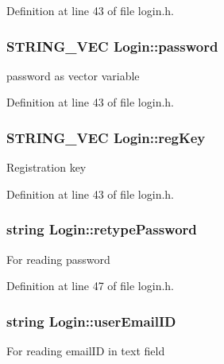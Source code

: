 Definition at line 43 of file login.\-h.

\hypertarget{classLogin_a39f7fd03b2b27c927c657ee73e7fcbbc}{
\subsubsection[{password}]{\setlength{\rightskip}{0pt plus 5cm}S\-T\-R\-I\-N\-G\-\_\-\-V\-E\-C Login\-::password\hspace{0.3cm}{\ttfamily [protected]}}}\label{classLogin_a39f7fd03b2b27c927c657ee73e7fcbbc}
password as vector variable 

Definition at line 43 of file login.\-h.

\hypertarget{classLogin_ae22f0ed73e5248cd71a7b2167676376a}{
\subsubsection[{reg\-Key}]{\setlength{\rightskip}{0pt plus 5cm}S\-T\-R\-I\-N\-G\-\_\-\-V\-E\-C Login\-::reg\-Key\hspace{0.3cm}{\ttfamily [protected]}}}\label{classLogin_ae22f0ed73e5248cd71a7b2167676376a}
Registration key 

Definition at line 43 of file login.\-h.

\hypertarget{classLogin_ade36f8943aafce470ef4b8353c79b2c6}{
\subsubsection[{retype\-Password}]{\setlength{\rightskip}{0pt plus 5cm}string Login\-::retype\-Password\hspace{0.3cm}{\ttfamily [protected]}}}\label{classLogin_ade36f8943aafce470ef4b8353c79b2c6}
For reading password 

Definition at line 47 of file login.\-h.

\hypertarget{classLogin_aa83b4706e0f0f0afc65f210ee8e4839a}{
\subsubsection[{user\-Email\-I\-D}]{\setlength{\rightskip}{0pt plus 5cm}string Login\-::user\-Email\-I\-D\hspace{0.3cm}{\ttfamily [protected]}}}\label{classLogin_aa83b4706e0f0f0afc65f210ee8e4839a}
For reading email\-I\-D in text field 

